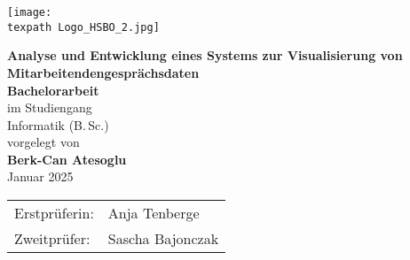 \begin{titlepage}
	
	\begin{flushright}
		\begin{minipage}[b]{0.5\textwidth}
			\hfill\texttt{[image: \\texpath Logo\_HSBO\_2.jpg]}
		\end{minipage}
	\end{flushright}
	
	\vspace{4cm}
	
	\begin{minipage}[b]{\textwidth}
		\centering
		
		{\huge \textbf{Analyse und Entwicklung eines Systems zur Visualisierung von Mitarbeitendengesprächsdaten}} \\[1.5cm] %
		
		{\large \textbf{Bachelorarbeit}} \\[0.15cm]
		im Studiengang \\
		Informatik (B.\,Sc.) \\[0.5cm] %
		
		vorgelegt von \\[0.15cm]
		{\large \textbf{Berk-Can Atesoglu}} \\[0.5cm] %
		
		Januar 2025 \\ %
	\end{minipage}
	
	\vfill
	
	\begin{minipage}[b]{\textwidth}
		\centering
		
		\begin{tabular}{ll}
			Erstprüferin: & Anja Tenberge \\
			Zweitprüfer: & Sascha Bajonczak
		\end{tabular} 
	\end{minipage}
		
\end{titlepage}